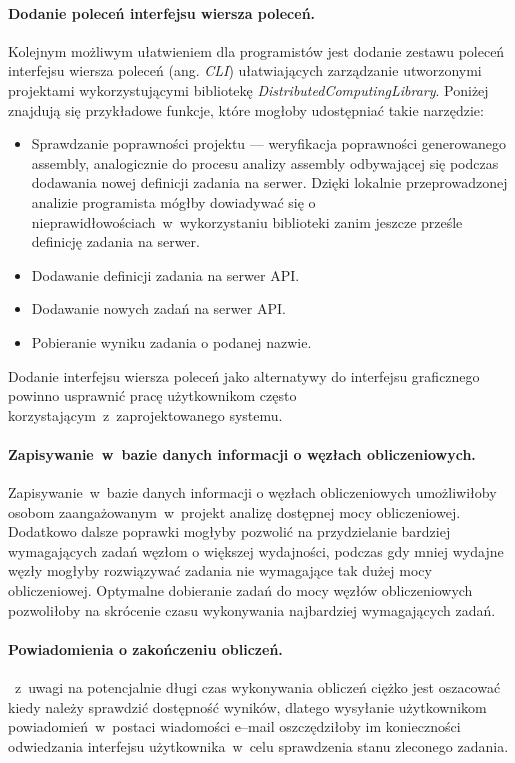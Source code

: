 \documentclass[a4paper,11pt,twoside]{report}
\theoremstyle{definition}
\begin{document}
        \paragraph{Dodanie poleceń interfejsu wiersza poleceń.}
        Kolejnym możliwym ułatwieniem dla programistów jest dodanie zestawu poleceń interfejsu wiersza poleceń (ang. \textit{CLI}) ułatwiających zarządzanie utworzonymi projektami wykorzystującymi bibliotekę \textit{DistributedComputingLibrary}. Poniżej znajdują się przykładowe funkcje, które mogłoby udostępniać takie narzędzie:
        
        \begin{itemize}
            \item Sprawdzanie poprawności projektu --- weryfikacja poprawności generowanego assembly, analogicznie do procesu analizy assembly odbywającej się podczas dodawania nowej definicji zadania na serwer. Dzięki lokalnie przeprowadzonej analizie programista mógłby dowiadywać się o nieprawidłowościach~w~wykorzystaniu biblioteki zanim jeszcze prześle definicję zadania na serwer.
            \item Dodawanie definicji zadania na serwer API.
            \item Dodawanie nowych zadań na serwer API.
            \item Pobieranie wyniku zadania o podanej nazwie.
        \end{itemize}
        
        Dodanie interfejsu wiersza poleceń jako alternatywy do interfejsu graficznego powinno usprawnić pracę użytkownikom często korzystającym~z~zaprojektowanego systemu.
        
        \paragraph{Zapisywanie~w~bazie danych informacji o węzłach obliczeniowych.}
        Zapisywanie~w~bazie danych informacji o węzłach obliczeniowych umożliwiłoby osobom zaangażowanym~w~projekt analizę dostępnej mocy obliczeniowej. 
        Dodatkowo dalsze poprawki mogłyby pozwolić na przydzielanie bardziej wymagających zadań węzłom o większej wydajności, podczas gdy mniej wydajne węzły mogłyby rozwiązywać zadania nie wymagające tak dużej mocy obliczeniowej.
        Optymalne dobieranie zadań do mocy węzłów obliczeniowych pozwoliłoby na skrócenie czasu wykonywania najbardziej wymagających zadań.
        
        \paragraph{Powiadomienia o zakończeniu obliczeń.}
       ~z~uwagi na potencjalnie długi czas wykonywania obliczeń ciężko jest oszacować kiedy należy sprawdzić dostępność wyników, dlatego wysyłanie użytkownikom powiadomień~w~postaci wiadomości e--mail oszczędziłoby im konieczności odwiedzania interfejsu użytkownika~w~celu sprawdzenia stanu zleconego zadania.
        
\end{document}
